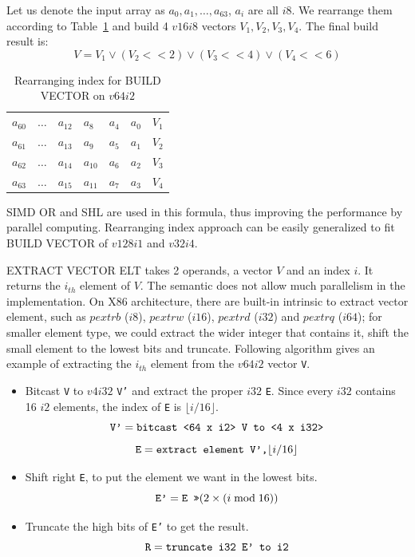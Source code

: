 Let us denote the input array as $a_0, a_1, \ldots, a_{63}$, $a_i$ are all $i8$. We rearrange them according to Table~\ref{table:build_vector} and build 4 $v16i8$ vectors $V_1, V_2, V_3, V_4$. The final build result is:
\begin{equation}
  V = V_1 \lor (V_2 << 2) \lor (V_3 << 4) \lor (V_4 << 6)
\end{equation}

\begin{table}[h]
\centering
\begin{tabular}{|p{1cm}|p{1cm}|p{1cm}|p{1cm}|p{1cm}|p{1cm}|r}
\cline{1-6}
$a_{60}$ & $\ldots$ & $a_{12}$ & $a_8$ & $a_4$ & $a_0$ & $V_1$ \\ \cline{1-6}
$a_{61}$ & $\ldots$ & $a_{13}$ & $a_9$ & $a_5$ & $a_1$ & $V_2$ \\ \cline{1-6}
$a_{62}$ & $\ldots$ & $a_{14}$ & $a_{10}$ & $a_6$ & $a_2$ & $V_3$ \\ \cline{1-6}
$a_{63}$ & $\ldots$ & $a_{15}$ & $a_{11}$ & $a_7$ & $a_3$ & $V_4$ \\ \cline{1-6}
\end{tabular}
\caption{Rearranging index for BUILD VECTOR on $v64i2$}
\label{table:build_vector}
\end{table}

SIMD OR and SHL are used in this formula, thus improving the performance by parallel computing. Rearranging index approach can be easily generalized to fit BUILD VECTOR of $v128i1$ and $v32i4$.

EXTRACT VECTOR ELT takes 2 operands, a vector $V$ and an index $i$. It returns the $i_{th}$ element of $V$. The semantic does not allow much parallelism in the implementation. On X86 architecture, there are built-in intrinsic to extract vector element, such as $pextrb$ ($i8$), $pextrw$ ($i16$), $pextrd$ ($i32$) and $pextrq$ ($i64$); for smaller element type, we could extract the wider integer that contains it, shift the small element to the lowest bits and truncate. Following algorithm gives an example of extracting the $i_{th}$ element from the $v64i2$ vector {\tt V}.

\begin{itemize}
  \item Bitcast {\tt V} to $v4i32$ {\tt V'} and extract the proper $i32$ {\tt E}. Since every $i32$ contains 16 $i2$ elements, the index of {\tt E} is $\lfloor i / 16 \rfloor$.
  \[\text{\tt V'} = \text{\tt bitcast <64 x i2> V to <4 x i32>} \]
  \[\text{\tt E} = \text{\tt extract element V',} \lfloor i / 16 \rfloor \]
  \item Shift right {\tt E}, to put the element we want in the lowest bits.
  \[\text{\tt E'} = \text{\tt E >>} (2 \times (i \bmod 16))\]
  \item Truncate the high bits of {\tt E'} to get the result.
  \[\text{\tt R} = \text{\tt truncate i32 E' to i2}\]
\end{itemize}

